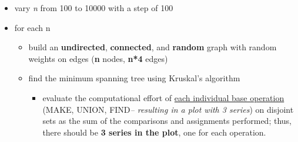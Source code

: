 \documentclass[../en-fa-lab.tex]{subfiles}
\begin{document}
\begin{itemize}
\item
  vary \emph{n} from 100 to 10000 with a step of 100
\item
  for each n

  \begin{itemize}
  \item
    build an \textbf{undirected}, \textbf{connected}, and
    \textbf{random} graph with random weights on edges (\textbf{n}
    nodes, \textbf{n*4} edges)
  \item
    find the minimum spanning tree using Kruskal's algorithm

    \begin{itemize}
    \item
      evaluate the computational effort of \ul{each individual base
      operation} (MAKE, UNION, FIND\emph{-- resulting in a plot with 3
      series}) on disjoint sets as the sum of the comparisons and
      assignments performed; thus, there should be \textbf{3 series in
      the plot}, one for each operation.
    \end{itemize}
  \end{itemize}
\end{itemize}
\end{document}
